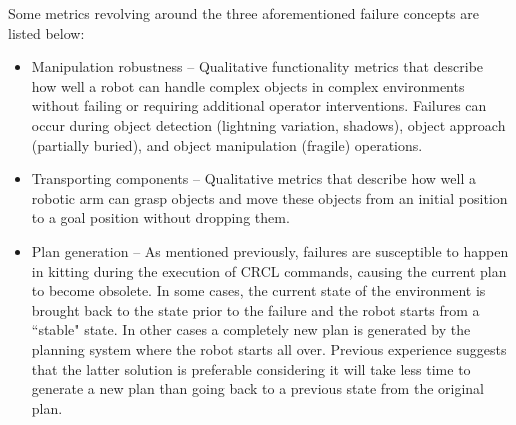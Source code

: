 Some metrics revolving around the three aforementioned failure concepts are listed below:
\begin{itemize}
\item \sf Manipulation robustness \rm -- Qualitative functionality metrics that describe how well a robot can handle complex objects in complex environments without failing or requiring additional operator interventions. Failures can occur during object detection (lightning variation, shadows), object approach (partially buried), and object manipulation (fragile) operations.\\
\item \sf Transporting components \rm -- Qualitative metrics that describe how well a robotic arm can grasp objects and move these objects from an initial position to a goal position without dropping them.\\
\item \sf Plan generation \rm -- As mentioned previously, failures are susceptible to happen in kitting during the execution of CRCL commands, causing the current plan to become obsolete. In some cases, the current state of the environment is brought back to the state prior to the failure and the robot starts from a ``stable" state. In other cases a completely new plan is generated by the planning system where the robot starts all over. Previous experience suggests that the latter solution is preferable considering it will take less time to generate a new plan than going back to a previous state from the original plan.


\end{itemize}

